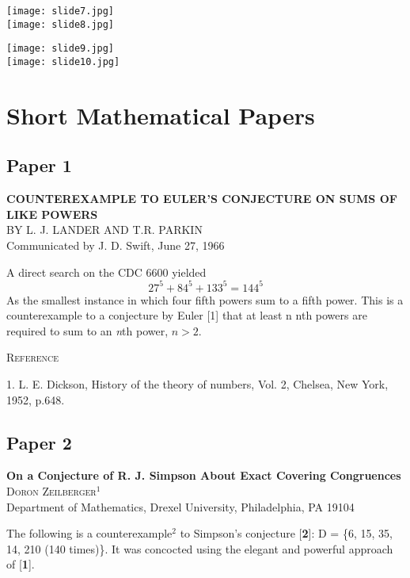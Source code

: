 \documentclass[oneside]{book}
\begin{document}
\newpage
\begin{center}
\texttt{[image: slide7.jpg]}\\
\texttt{[image: slide8.jpg]}
\end{center}

\newpage
\begin{center}
\texttt{[image: slide9.jpg]}\\
\texttt{[image: slide10.jpg]}
\end{center}

\cite{IntegrationByParts}

\chapter{Short Mathematical Papers}
\section{Paper 1}
\vspace{1in} \rmfamily
\begin{center}
\Large{\bfseries COUNTEREXAMPLE TO EULER’S CONJECTURE ON SUMS OF LIKE POWERS} \\
\bigskip 
BY L. J. LANDER AND T.R. PARKIN \\
Communicated by J. D. Swift, June 27, 1966
\end{center}
\bigskip
A direct search on the CDC 6600 yielded
$$27^5 + 84^5 + 133^5 = 144^5$$
As the smallest instance in which four fifth powers sum to a fifth power. This is a counterexample to a conjecture by Euler [1] that at least n nth powers are required to sum to an \textit{n}th power, $n>2$.
\bigskip

\begin{center} \textsc{Reference} \end{center}
1.	L. E. Dickson, History of the theory of numbers, Vol. 2, Chelsea, New York, 1952, p.648.\\

\cite{CounterToEuler}

\newpage
\section{Paper 2}
\begin{center}
\vspace{2in}
\Large{\bfseries On a Conjecture of R. J. Simpson About Exact Covering Congruences}\\ \normalsize
\bigskip
\textsc{Doron Zeilberger$^1$}\\
\bigskip
Department of Mathematics, Drexel University, Philadelphia, PA 19104
\end{center}
\bigskip
The following is a counterexample$^2$ to Simpson’s conjecture [\textbf{2}]: D = \{6, 15, 35, 14, 210 (140 times)\}. It was concocted using the elegant and powerful approach of [\textbf{1}].\\
\end{document}
